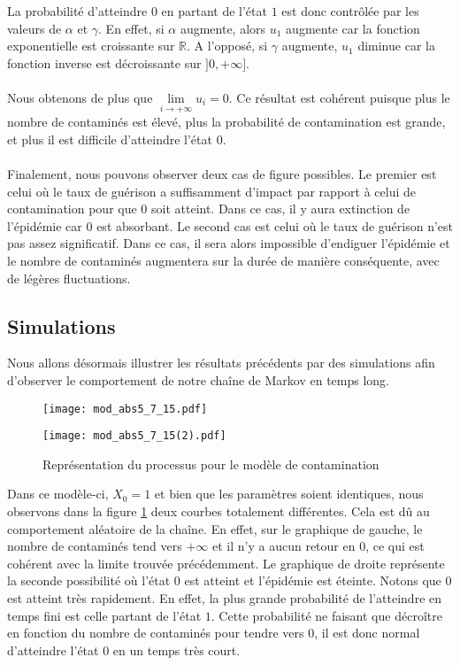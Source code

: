 \documentclass[12pt,a4paper]{report}
\theoremstyle{remark}
\begin{document}
La probabilité d'atteindre $0$ en partant de l'état $1$ est donc contrôlée par les valeurs de $\alpha$ et $\gamma$. En effet, si $\alpha$ augmente, alors $u_1$ augmente car la fonction exponentielle est croissante sur $\mathbb{R}$. A l'opposé, si $\gamma$ augmente, $u_1$ diminue car la fonction inverse est décroissante sur $]0,+\infty]$.
\\
\\
Nous obtenons de plus que $\lim\limits_{i \rightarrow +\infty} u_i = 0$. Ce résultat est cohérent puisque plus le nombre de contaminés est élevé, plus la probabilité de contamination est grande, et plus il est difficile d'atteindre l'état $0$.
\\
\\
Finalement, nous pouvons observer deux cas de figure possibles. Le premier est celui où le taux de guérison a suffisamment d'impact par rapport à celui de contamination pour que $0$ soit atteint. Dans ce cas, il y aura extinction de l'épidémie car $0$ est absorbant. Le second cas est celui où le taux de guérison n'est pas assez significatif. Dans ce cas, il sera alors impossible d'endiguer l'épidémie et le nombre de contaminés augmentera sur la durée de manière conséquente, avec de légères fluctuations.

\subsection{Simulations}
\vspace{0.6cm}

Nous allons désormais illustrer les résultats précédents par des simulations afin d'observer le comportement de notre chaîne de Markov en temps long.
\newpage
\begin{figure}[h]
    \begin{minipage}[c]{0.25\linewidth}
        \centering
        \texttt{[image: mod\_abs5\_7\_15.pdf]}
    \end{minipage}
    \hfill%
    \vspace{0.1cm}
    \begin{minipage}[c]{0.50\linewidth}
        \centering
       \texttt{[image: mod\_abs5\_7\_15(2).pdf]}
    \end{minipage}
    \caption{Représentation du processus pour le modèle de contamination}
    \label{modele_conta}
\end{figure}

Dans ce modèle-ci, $X_0 =1$ et bien que les paramètres soient identiques, nous observons dans la figure \ref{modele_conta} deux courbes totalement différentes. Cela est dû au comportement aléatoire de la chaîne. En effet, sur le graphique de gauche, le nombre de contaminés tend vers $+\infty$ et il n'y a aucun retour en $0$, ce qui est cohérent avec la limite trouvée précédemment. Le graphique de droite représente la seconde possibilité où l'état $0$ est atteint et l'épidémie est éteinte. Notons que $0$ est atteint très rapidement. En effet, la plus grande probabilité de l'atteindre en temps fini est celle partant de l'état $1$. Cette probabilité ne faisant que décroître en fonction du nombre de contaminés pour tendre vers $0$, il est donc normal d'atteindre l'état $0$ en un temps très court.
\end{document}
